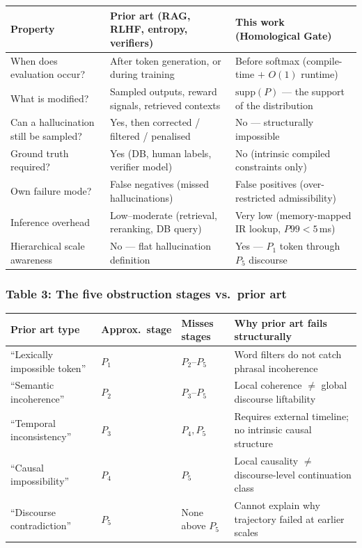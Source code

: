 \documentclass[11pt,a4paper]{article}
\begin{document}
\begin{center}
\renewcommand{\arraystretch}{1.3}\small
\begin{tabular}{p{4.2cm}p{4.5cm}p{4.5cm}}
\toprule
\textbf{Property} &
\textbf{Prior art} (RAG, RLHF, entropy, verifiers) &
\textbf{This work} (Homological Gate) \\
\midrule
When does evaluation occur? &
  After token generation, or during training &
  Before softmax (compile-time $+$ $O(1)$ runtime) \\
What is modified? &
  Sampled outputs, reward signals, retrieved contexts &
  $\mathrm{supp}(P)$ --- the support of the distribution \\
Can a hallucination still be sampled? &
  Yes, then corrected / filtered / penalised &
  No --- structurally impossible \\
Ground truth required? &
  Yes (DB, human labels, verifier model) &
  No (intrinsic compiled constraints only) \\
Own failure mode? &
  False negatives (missed hallucinations) &
  False positives (over-restricted admissibility) \\
Inference overhead &
  Low--moderate (retrieval, reranking, DB query) &
  Very low (memory-mapped IR lookup, $P99 < 5\,$ms) \\
Hierarchical scale awareness &
  No --- flat hallucination definition &
  Yes --- $P_1$ token through $P_5$ discourse \\
\bottomrule
\end{tabular}
\end{center}

\subsubsection*{Table 3: The five obstruction stages vs.\ prior art}

\begin{center}
\renewcommand{\arraystretch}{1.3}\small
\begin{tabular}{p{2.8cm}p{1.8cm}p{2.5cm}p{5.0cm}}
\toprule
\textbf{Prior art type} &
\textbf{Approx.\ stage} &
\textbf{Misses stages} &
\textbf{Why prior art fails structurally} \\
\midrule
``Lexically impossible token'' & $P_1$ & $P_2$--$P_5$ &
  Word filters do not catch phrasal incoherence \\
``Semantic incoherence'' & $P_2$ & $P_3$--$P_5$ &
  Local coherence $\neq$ global discourse liftability \\
``Temporal inconsistency'' & $P_3$ & $P_4, P_5$ &
  Requires external timeline; no intrinsic causal structure \\
``Causal impossibility'' & $P_4$ & $P_5$ &
  Local causality $\neq$ discourse-level continuation class \\
``Discourse contradiction'' & $P_5$ & None above $P_5$ &
  Cannot explain why trajectory failed at earlier scales \\
\bottomrule
\end{tabular}
\end{center}
\end{document}
